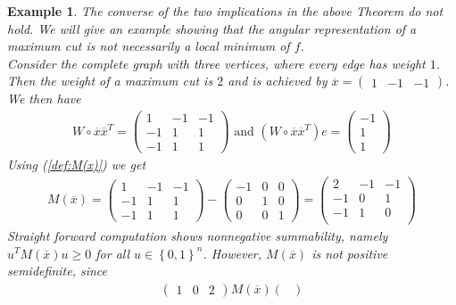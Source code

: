 \documentclass[12pt,a4paper]{article}
\theoremstyle{mythm}
\newtheorem*{exa}{Example}
\begin{document}
\begin{exa}
The converse of the two implications in the above Theorem do not hold. We will give an example showing that the angular representation of a maximum cut is not necessarily a
local minimum of $ f $. \\
Consider the complete graph with three vertices, where every edge has weight $ 1 $.
Then the weight of a maximum cut is $ 2 $ and is achieved by 
$ \overline{ x } = \begin{pmatrix}
1 & -1 & -1
\end{pmatrix}   $.
We then have 
\begin{align*}
W \circ \overline{ x } \overline{ x } ^T = \begin{pmatrix}
1 & -1 & -1 \\
-1 &1 & 1 \\
-1 & 1 & 1
\end{pmatrix} 
\text{ and } 
\left( W \circ \overline{ x } \overline{ x } ^T \right)  e = \begin{pmatrix}
-1 \\
1 \\
1
\end{pmatrix} 
\end{align*} 
Using (\ref{def:M(x)}) we get
\begin{align*}
M( \overline{ x } ) = 
\begin{pmatrix}
1 & -1 & -1 \\
-1 &1 & 1 \\
-1 & 1 & 1
\end{pmatrix} 
- 
\begin{pmatrix}
-1 & 0 & 0 \\
0 & 1 & 0 \\
0 & 0 & 1
\end{pmatrix} 
= \begin{pmatrix}
2 & -1 & -1 \\
-1 & 0 & 1 \\
-1 & 1 & 0 \\
\end{pmatrix} 
\end{align*} 
Straight forward computation shows nonnegative summability, namely $ u ^T M ( \overline{ x } ) u \geq 0  $ for all $ u \in \left\{ 0,1 \right\} ^{ n }  $.
However, $ M ( \overline{ x } )  $ is not positive semidefinite, since
\begin{align*}
\begin{pmatrix}
1 & 0 & 2
\end{pmatrix} 
M ( \overline{ x } ) 
\begin{pmatrix}

\end{pmatrix}
\end{align*}
\end{exa}
\end{document}
